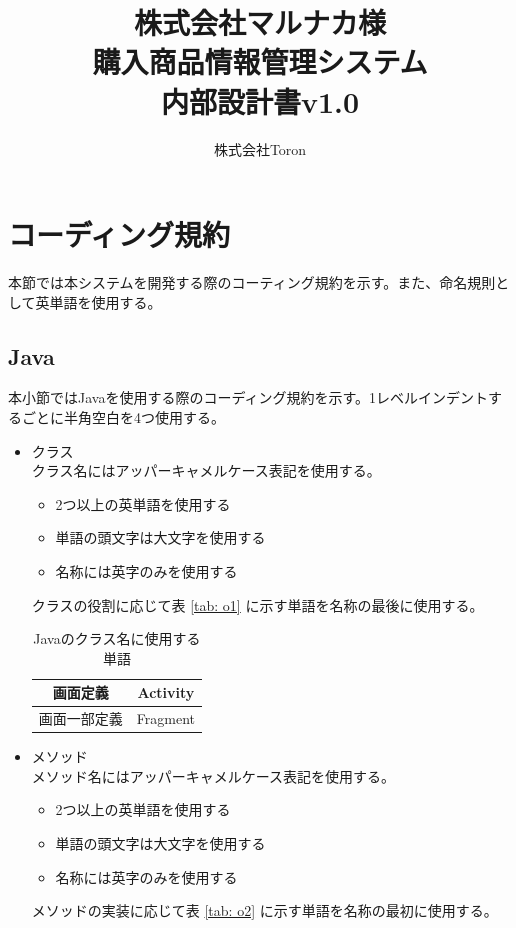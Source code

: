 \documentclass[a4j]{jarticle}
\title{
\vspace{30mm}
株式会社マルナカ様\\
購入商品情報管理システム\\
内部設計書v1.0
\vspace{90mm}
}
\author{
株式会社Toron
}
\begin{document}
\maketitle
\newpage
\tableofcontents
\newpage
\section{コーディング規約}

本節では本システムを開発する際のコーティング規約を示す。また、命名規則として英単語を使用する。
\subsection{Java}

本小節ではJavaを使用する際のコーディング規約を示す。1レベルインデントするごとに半角空白を4つ使用する。
\begin{itemize}
	\item クラス\\
		クラス名にはアッパーキャメルケース表記を使用する。
	\begin{itemize}
		\item 2つ以上の英単語を使用する
		\item 単語の頭文字は大文字を使用する
		\item 名称には英字のみを使用する
	\end{itemize}
		クラスの役割に応じて表 \ref {tab: o1} に示す単語を名称の最後に使用する。
		\begin{table}[H]
			\caption{Javaのクラス名に使用する単語}
			\label{tab:o1}
			\begin{center}
			\begin{tabular}{|c|c|}
			\hline
			画面定義 & Activity\\\hline
			画面一部定義 & Fragment\\\hline
			\end{tabular}
			\end{center}
			\end{table}
	\item メソッド\\
		メソッド名にはアッパーキャメルケース表記を使用する。
	\begin{itemize}
		\item 2つ以上の英単語を使用する
		\item 単語の頭文字は大文字を使用する
		\item 名称には英字のみを使用する
	\end{itemize}
		メソッドの実装に応じて表 \ref {tab: o2} に示す単語を名称の最初に使用する。

\end{itemize}
\end{document}

